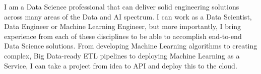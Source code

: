 I am a Data Science professional that can deliver solid engineering solutions across many areas of the Data and AI spectrum. I can work as a Data Scientist, Data Engineer or Machine Learning Engineer, but more importantly, I bring experience from each of these disciplines to be able to accomplish end-to-end Data Science solutions. From developing Machine Learning algorithms to creating complex, Big Data-ready ETL pipelines to deploying Machine Learning as a Service, I can take a project from idea to API and deploy this to the cloud.